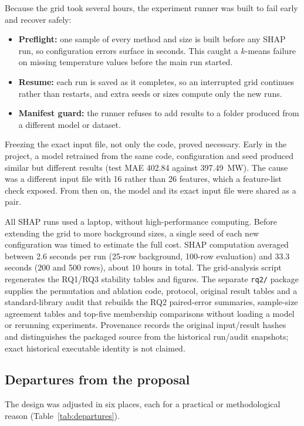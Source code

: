 \documentclass[11pt,a4paper]{article}
\begin{document}
Because the grid took several hours, the experiment runner was built to fail early and recover safely:
\begin{itemize}
  \item \textbf{Preflight:} one sample of every method and size is built before any SHAP run, so configuration errors surface in seconds. This caught a $k$-means failure on missing temperature values before the main run started.
  \item \textbf{Resume:} each run is saved as it completes, so an interrupted grid continues rather than restarts, and extra seeds or sizes compute only the new runs.
  \item \textbf{Manifest guard:} the runner refuses to add results to a folder produced from a different model or dataset.
\end{itemize}

Freezing the exact input file, not only the code, proved necessary. Early in the project, a model retrained from the same code, configuration and seed produced similar but different results (test MAE 402.84 against 397.49~MW). The cause was a different input file with 16 rather than 26 features, which a feature-list check exposed. From then on, the model and its exact input file were shared as a pair.

All SHAP runs used a laptop, without high-performance computing. Before extending the grid to more background sizes, a single seed of each new configuration was timed to estimate the full cost. SHAP computation averaged between 2.6 seconds per run (25-row background, 100-row evaluation) and 33.3 seconds (200 and 500 rows), about 10 hours in total. The grid-analysis script regenerates the RQ1/RQ3 stability tables and figures. The separate \texttt{rq2/} package supplies the permutation and ablation code, protocol, original result tables and a standard-library audit that rebuilds the RQ2 paired-error summaries, sample-size agreement tables and top-five membership comparisons without loading a model or rerunning experiments. Provenance records the original input/result hashes and distinguishes the packaged source from the historical run/audit snapshots; exact historical executable identity is not claimed.

\subsection{Departures from the proposal}\label{sec:departures}

The design was adjusted in six places, each for a practical or methodological reason (Table~\ref{tab:departures}).
\end{document}
